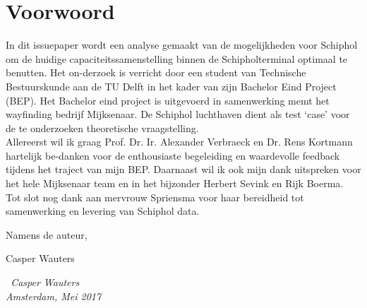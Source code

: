 \chapter*{Voorwoord}

In dit issuepaper wordt een analyse gemaakt van de mogelijkheden voor Schiphol om de huidige capaciteitssamenstelling binnen de Schipholterminal optimaal te benutten. Het on-derzoek is verricht door een student van Technische Bestuurskunde aan de TU Delft in het kader van zijn Bachelor Eind Project (BEP). 
Het Bachelor eind project is uitgevoerd in samenwerking memt het wayfinding bedrijf Mijksenaar. De Schiphol luchthaven dient als test ‘case’ voor de te onderzoeken theoretische vraagstelling.
\\

\vspace{5mm} 
Allereerst wil ik graag Prof. Dr. Ir. Alexander Verbraeck en Dr. Rens Kortmann hartelijk be-danken voor de enthousiaste begeleiding en waardevolle feedback tijdens het traject van mijn BEP. Daarnaast wil ik ook mijn dank uitspreken voor het hele Mijksenaar team en in het bijzonder Herbert Sevink en Rijk Boerma. Tot slot nog dank aan mervrouw Spriensma voor haar bereidheid tot samenwerking en levering van Schiphol data.

\vspace{5mm} 
Namens de auteur,

\vspace{5mm} 
Casper Wauters


\begin{flushright}
{\makeatletter\itshape
    \ Casper Wauters \\
    Amsterdam, Mei 2017
\makeatother}
\end{flushright}



